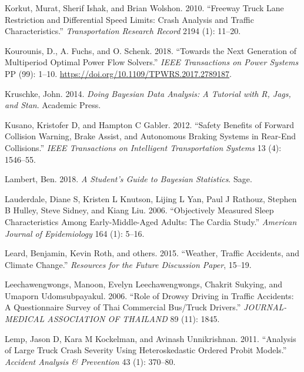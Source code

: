 \documentclass[12pt]{book}
\numberwithin{equation}{chapter}
\begin{document}
\leavevmode\hypertarget{ref-korkut2010freeway}{}%
Korkut, Murat, Sherif Ishak, and Brian Wolshon. 2010. ``Freeway Truck Lane Restriction and Differential Speed Limits: Crash Analysis and Traffic Characteristics.'' \emph{Transportation Research Record} 2194 (1): 11--20.

\leavevmode\hypertarget{ref-Kourounis2018}{}%
Kourounis, D., A. Fuchs, and O. Schenk. 2018. ``Towards the Next Generation of Multiperiod Optimal Power Flow Solvers.'' \emph{IEEE Transactions on Power Systems} PP (99): 1--10. \url{https://doi.org/10.1109/TPWRS.2017.2789187}.

\leavevmode\hypertarget{ref-kruschke2014doing}{}%
Kruschke, John. 2014. \emph{Doing Bayesian Data Analysis: A Tutorial with R, Jags, and Stan}. Academic Press.

\leavevmode\hypertarget{ref-kusano2012safety}{}%
Kusano, Kristofer D, and Hampton C Gabler. 2012. ``Safety Benefits of Forward Collision Warning, Brake Assist, and Autonomous Braking Systems in Rear-End Collisions.'' \emph{IEEE Transactions on Intelligent Transportation Systems} 13 (4): 1546--55.

\leavevmode\hypertarget{ref-lambert2018student}{}%
Lambert, Ben. 2018. \emph{A Student's Guide to Bayesian Statistics}. Sage.

\leavevmode\hypertarget{ref-lauderdale2006objectively}{}%
Lauderdale, Diane S, Kristen L Knutson, Lijing L Yan, Paul J Rathouz, Stephen B Hulley, Steve Sidney, and Kiang Liu. 2006. ``Objectively Measured Sleep Characteristics Among Early-Middle-Aged Adults: The Cardia Study.'' \emph{American Journal of Epidemiology} 164 (1): 5--16.

\leavevmode\hypertarget{ref-leard2015weather}{}%
Leard, Benjamin, Kevin Roth, and others. 2015. ``Weather, Traffic Accidents, and Climate Change.'' \emph{Resources for the Future Discussion Paper}, 15--19.

\leavevmode\hypertarget{ref-leechawengwongs2006role}{}%
Leechawengwongs, Manoon, Evelyn Leechawengwongs, Chakrit Sukying, and Umaporn Udomsubpayakul. 2006. ``Role of Drowsy Driving in Traffic Accidents: A Questionnaire Survey of Thai Commercial Bus/Truck Drivers.'' \emph{JOURNAL-MEDICAL ASSOCIATION OF THAILAND} 89 (11): 1845.

\leavevmode\hypertarget{ref-lemp2011analysis}{}%
Lemp, Jason D, Kara M Kockelman, and Avinash Unnikrishnan. 2011. ``Analysis of Large Truck Crash Severity Using Heteroskedastic Ordered Probit Models.'' \emph{Accident Analysis \& Prevention} 43 (1): 370--80.
\end{document}
